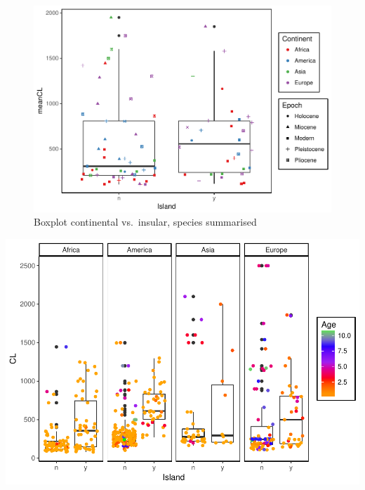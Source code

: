 \documentclass[]{article}
\begin{document}
\begin{figure}[htbp]
\centering
\includegraphics{MA_JJ_files/figure-latex/Boxplot continental vs. insular, species summarised-1.pdf}
\caption{Boxplot continental vs.~insular, species summarised}
\end{figure}

\includegraphics{MA_JJ_files/figure-latex/unnamed-chunk-1-1.pdf}
\end{document}
